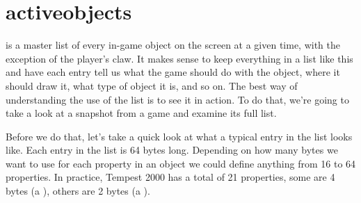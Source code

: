 \chapter{activeobjects}
\label{sec:activeobjects}
\lstset{style=68KStyle}
\lhead[tempest 2000]{}
\vspace{-0.4cm}

 is a master list of every in-game object on the screen at a given time, with the
exception of the player's claw. It makes sense to keep everything in a list like this and have each
entry tell us what the game should do with the object, where it should draw it, what type of object
it is, and so on. The best way of understanding the use of the  list is to see it
in action. To do that, we're going to take a look at a snapshot from a game and examine its full 
 list.

Before we do that, let's take a quick look at what a typical entry in the  list 
looks like. Each entry in the  list is 64 bytes long. Depending on how many bytes we
want to use for each property in an object we could define anything from 16
to 64 properties. In practice, Tempest 2000 has a total of 21 properties, some are 4 bytes (a ),
others are 2 bytes (a ).

